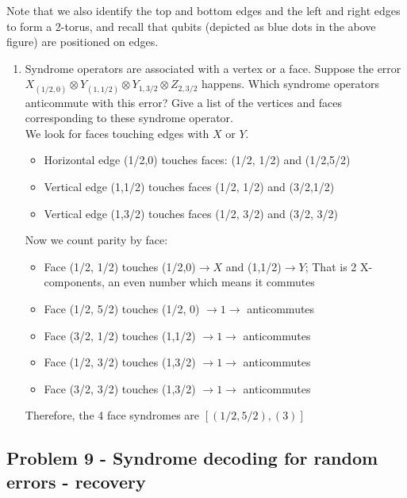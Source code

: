 Note that we also identify the top and bottom edges and the left and right edges to form a 2-torus, and recall that qubits (depicted as blue dots in the above figure) are positioned on edges.

\begin{enumerate}
    \item Syndrome operators are associated with a vertex or a face. Suppose the error $X_{(1/2,0)} \otimes Y_{(1,1/2)} \otimes Y_{1,3/2} \otimes Z_{2,3/2}$ happens. Which syndrome operators anticommute with this error? Give a list of the vertices and faces corresponding to these syndrome operator. \\

    We look for faces touching edges with $X$ or $Y$. 
    \begin{itemize}
        \item Horizontal edge (1/2,0) touches faces: (1/2, 1/2) and (1/2,5/2)
        \item Vertical edge (1,1/2) touches faces (1/2, 1/2) and (3/2,1/2) 
        \item Vertical edge (1,3/2) touches faces (1/2, 3/2) and (3/2, 3/2)
    \end{itemize}

    Now we count parity by face: 
    \begin{itemize}
        \item Face (1/2, 1/2) touches (1/2,0)$\rightarrow X$ and (1,1/2)$\rightarrow Y$; That is 2 X-components, an even number which means it commutes
        \item Face (1/2, 5/2) touches (1/2, 0) $\rightarrow 1 \rightarrow$ anticommutes
        \item Face (3/2, 1/2) touches (1,1/2) $\rightarrow 1 \rightarrow$ anticommutes
        \item Face (1/2, 3/2) touches (1,3/2) $\rightarrow 1 \rightarrow$ anticommutes
        \item Face (3/2, 3/2) touches (1,3/2) $\rightarrow 1 \rightarrow$ anticommutes
    \end{itemize}
    Therefore, the 4 face syndromes are $[(1/2,5/2), (3)]$
\end{enumerate}




\newpage
\subsection{Problem 9 - Syndrome decoding for random errors - recovery}




